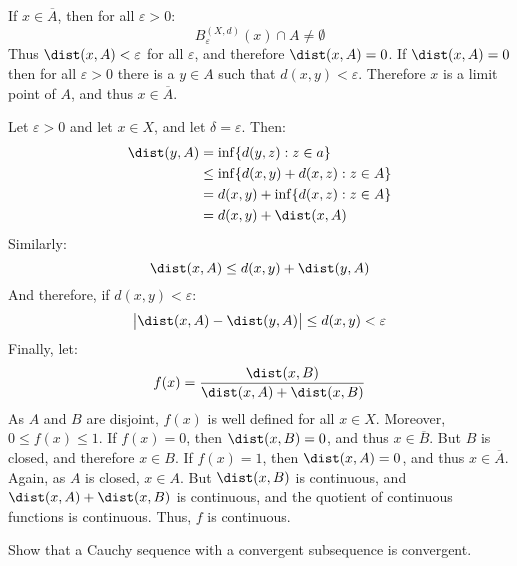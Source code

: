 \documentclass[crop=false,class=article,oneside]{standalone}
\begin{document}
    \begin{solution}
        If $x\in\overline{A}$, then for all $\varepsilon>0$:
        \begin{equation}
            B_{\varepsilon}^{(X,d)}(x)\cap{A}\ne\emptyset
        \end{equation}
        Thus $\dist(x,A)<\varepsilon$ for all $\varepsilon$, and therefore
        $\dist(x,A)=0$. If $\dist(x,A)=0$ then for all $\varepsilon>0$
        there is a $y\in{A}$ such that $d(x,y)<\varepsilon$. Therefore
        $x$ is a limit point of $A$, and thus $x\in\overline{A}$.
        \par\hfill\par
        Let $\varepsilon>0$ and let $x\in{X}$, and let $\delta=\varepsilon$.
        Then:
        \begin{subequations}
            \begin{align}
                \dist(y,A)&=\inf\{d(y,z):z\in{a}\}\\
                &\leq\inf\{d(x,y)+d(x,z):z\in{A}\}\\
                &=d(x,y)+\inf\{d(x,z):z\in{A}\}\\
                &=d(x,y)+\dist(x,A)
            \end{align}
        \end{subequations}
        Similarly:
        \begin{equation}
            \dist(x,A)\leq{d}(x,y)+\dist(y,A)
        \end{equation}
        And therefore, if $d(x,y)<\varepsilon$:
        \begin{equation}
            \big|\dist(x,A)-\dist(y,A)\big|\leq{d}(x,y)<\varepsilon
        \end{equation}
        Finally, let:
        \begin{equation}
            f(x)=\frac{\dist(x,B)}{\dist(x,A)+\dist(x,B)}
        \end{equation}
        As $A$ and $B$ are disjoint, $f(x)$ is well defined for all
        $x\in{X}$. Moreover, $0\leq{f(x)}\leq{1}$. If $f(x)=0$, then
        $\dist(x,B)=0$, and thus $x\in\overline{B}$. But $B$ is closed,
        and therefore $x\in{B}$. If $f(x)=1$, then $\dist(x,A)=0$, and
        thus $x\in\overline{A}$. Again, as $A$ is closed, $x\in{A}$.
        But $\dist(x,B)$ is continuous, and $\dist(x,A)+\dist(x,B)$ is
        continuous, and the quotient of continuous functions is continuous.
        Thus, $f$ is continuous.
    \end{solution}
    \begin{problem}
        Show that a Cauchy sequence with a convergent subsequence is
        convergent.
    \end{problem}
\end{document}
